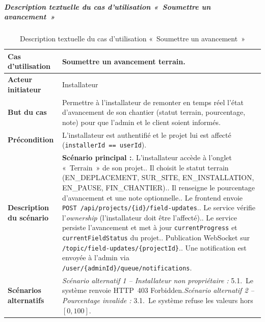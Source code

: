 \subparagraph{Description textuelle du cas d'utilisation «~Soumettre un avancement~»}

\begin{table}[H]
  \caption{Description textuelle du cas d'utilisation «~Soumettre un avancement~»}
  \label{tab:cu-soumettre-avancement}
  \centering
  \begin{tabularx}{\textwidth}{|L{3.8cm}|X|}
    \hline
    \textbf{Cas d'utilisation} & Soumettre un avancement terrain. \\
    \hline
    \textbf{Acteur initiateur} & Installateur \\
    \hline
    \textbf{But du cas} & Permettre à l'installateur de remonter en temps réel l'état d'avancement de son chantier (statut terrain, pourcentage, note) pour que l'admin et le client soient informés. \\
    \hline
    \textbf{Précondition} & L'installateur est authentifié et le projet lui est affecté (\texttt{installerId == userId}). \\
    \hline
    \textbf{Description du scénario} &
    \textbf{Scénario principal :}. L'installateur accède à l'onglet «~Terrain~» de son projet.. Il choisit le statut terrain (EN\_DEPLACEMENT, SUR\_SITE, EN\_INSTALLATION, EN\_PAUSE, FIN\_CHANTIER).. Il renseigne le pourcentage d'avancement et une note optionnelle.. Le frontend envoie \texttt{POST /api/projects/\{id\}/field-updates}.. Le service vérifie l'\textit{ownership} (l'installateur doit être l'affecté).. Le service persiste l'avancement et met à jour \texttt{currentProgress} et \texttt{currentFieldStatus} du projet.. Publication WebSocket sur \texttt{/topic/field-updates/\{projectId\}}.. Une notification est envoyée à l'admin via \texttt{/user/\{adminId\}/queue/notifications}.\\
    \hline
    \textbf{Scénarios alternatifs} &
    \textit{Scénario alternatif 1 -- Installateur non propriétaire :}\newline
    \hspace*{6pt}5.1.~Le système renvoie HTTP~403 Forbidden.\newline[2pt]
    \textit{Scénario alternatif 2 -- Pourcentage invalide :}\newline
    \hspace*{6pt}3.1.~Le système refuse les valeurs hors $[0, 100]$.\\
    \hline
  \end{tabularx}
\end{table}

